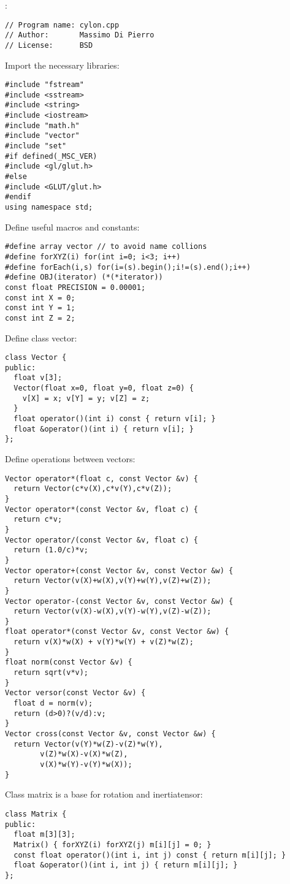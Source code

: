 \noindent
: \begin{lstlisting}
// Program name: cylon.cpp         
// Author:       Massimo Di Pierro 
// License:      BSD
\end{lstlisting}
\noindent
Import the necessary libraries: \begin{lstlisting}
#include "fstream"
#include <sstream>
#include <string>
#include <iostream>
#include "math.h"
#include "vector"
#include "set"
#if defined(_MSC_VER)
#include <gl/glut.h>
#else
#include <GLUT/glut.h>
#endif
using namespace std;
\end{lstlisting}
\noindent
Define useful macros and constants: \begin{lstlisting}
#define array vector // to avoid name collions
#define forXYZ(i) for(int i=0; i<3; i++)
#define forEach(i,s) for(i=(s).begin();i!=(s).end();i++)
#define OBJ(iterator) (*(*iterator))
const float PRECISION = 0.00001;
const int X = 0;
const int Y = 1;
const int Z = 2;
\end{lstlisting}
\noindent
Define class vector: \begin{lstlisting}
class Vector {
public:
  float v[3];
  Vector(float x=0, float y=0, float z=0) {
    v[X] = x; v[Y] = y; v[Z] = z;
  }
  float operator()(int i) const { return v[i]; }
  float &operator()(int i) { return v[i]; }
};
\end{lstlisting}
\noindent
Define operations between vectors: \begin{lstlisting}
Vector operator*(float c, const Vector &v) {
  return Vector(c*v(X),c*v(Y),c*v(Z));
}
Vector operator*(const Vector &v, float c) {
  return c*v;
}
Vector operator/(const Vector &v, float c) {
  return (1.0/c)*v;
}
Vector operator+(const Vector &v, const Vector &w) {
  return Vector(v(X)+w(X),v(Y)+w(Y),v(Z)+w(Z));
}
Vector operator-(const Vector &v, const Vector &w) {
  return Vector(v(X)-w(X),v(Y)-w(Y),v(Z)-w(Z));
}
float operator*(const Vector &v, const Vector &w) {
  return v(X)*w(X) + v(Y)*w(Y) + v(Z)*w(Z);
}
float norm(const Vector &v) {
  return sqrt(v*v);
}
Vector versor(const Vector &v) {
  float d = norm(v);
  return (d>0)?(v/d):v;
}
Vector cross(const Vector &v, const Vector &w) {
  return Vector(v(Y)*w(Z)-v(Z)*w(Y),
		v(Z)*w(X)-v(X)*w(Z),
		v(X)*w(Y)-v(Y)*w(X));
}
\end{lstlisting}
\noindent
Class matrix is a base for rotation and inertiatensor: \begin{lstlisting}
class Matrix {
public:
  float m[3][3];
  Matrix() { forXYZ(i) forXYZ(j) m[i][j] = 0; }
  const float operator()(int i, int j) const { return m[i][j]; }
  float &operator()(int i, int j) { return m[i][j]; }
};
\end{lstlisting}
